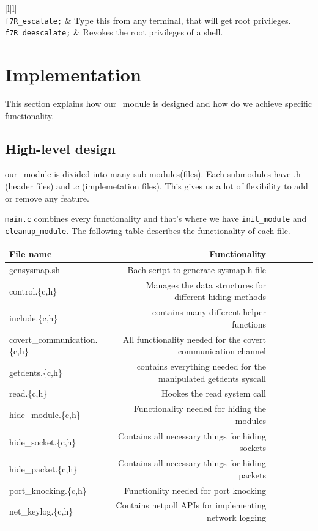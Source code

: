 \documentclass[10pt, letterpaper]{scrartcl}
\begin{document}
\begin{table}
\begin{tabular}{ |l|l| }
 \\
\hline
\texttt{f7R\_escalate;} & Type this from any terminal, that will get root privileges.\\ 
\texttt{f7R\_deescalate;} & Revokes the root privileges of a shell.\\ \hline

\end{tabular}
\caption{Commands to control the rootkit}
\label{tab:commands}
\end{table}

\section{Implementation}
This section explains how our\_module is designed and how do we achieve specific functionality. 

\subsection{High-level design}
our\_module is divided into many sub-modules(files). Each submodules have .h (header files) and .c (implemetation files).
This gives us a lot of flexibility to add or remove any feature.

\texttt{main.c} combines every functionality and that's where we have \texttt{init\_module} and \texttt{cleanup\_module}.
The following table describes the functionality of each file.



\begin{tabular}{l*{6}r}
File name             & Functionality \\
\hline
gensysmap.sh & Bach script to generate sysmap.h file\\
control.\{c,h\} & Manages the data structures for different hiding methods\\
include.\{c,h\} & contains many different helper functions   \\
covert\_communication.\{c,h\} & All functionality needed for the covert communication channel \\
getdents.\{c,h\} & contains everything needed for the manipulated getdents syscall\\
read.\{c,h\} & Hookes the read system call \\
hide\_module.\{c,h\} & Functionality needed for hiding the modules\\
hide\_socket.\{c,h\} & Contains all necessary things for hiding sockets\\
hide\_packet.\{c,h\} & Contains all necessary things for hiding packets\\
port\_knocking.\{c,h\} & Functionlity needed for port knocking\\
net\_keylog.\{c,h\} & Contains netpoll APIs for implementing network logging\\

\end{tabular}
\end{document}
